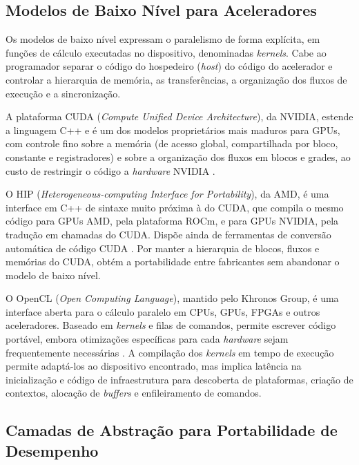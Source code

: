 
\subsection{Modelos de Baixo Nível para Aceleradores}\label{subsec:modelos-de-baixo-nivel}

Os modelos de baixo nível expressam o paralelismo de forma explícita, em funções de cálculo executadas no dispositivo, denominadas \textit{kernels}.
Cabe ao programador separar o código do hospedeiro (\textit{host}) do código do acelerador e controlar a hierarquia de memória, as transferências, a organização dos fluxos de execução e a sincronização.

A plataforma CUDA (\textit{Compute Unified Device Architecture}), da NVIDIA, estende a linguagem C++ e é um dos modelos proprietários mais maduros para GPUs, com controle fino sobre a memória (de acesso global, compartilhada por bloco, constante e registradores) e sobre a organização dos fluxos em blocos e grades, ao custo de restringir o código a \textit{hardware} NVIDIA \parencite{Chakrabarti2012}.

O HIP (\textit{Heterogeneous-computing Interface for Portability}), da AMD, é uma interface em C++ de sintaxe muito próxima à do CUDA, que compila o mesmo código para GPUs AMD, pela plataforma ROCm, e para GPUs NVIDIA, pela tradução em chamadas do CUDA.
Dispõe ainda de ferramentas de conversão automática de código CUDA \parencite{AMD2026HIP}.
Por manter a hierarquia de blocos, fluxos e memórias do CUDA, obtém a portabilidade entre fabricantes sem abandonar o modelo de baixo nível.

O OpenCL (\textit{Open Computing Language}), mantido pelo Khronos Group, é uma interface aberta para o cálculo paralelo em CPUs, GPUs, FPGAs e outros aceleradores.
Baseado em \textit{kernels} e filas de comandos, permite escrever código portável, embora otimizações específicas para cada \textit{hardware} sejam frequentemente necessárias \parencite{Stone2010}.
A compilação dos \textit{kernels} em tempo de execução permite adaptá-los ao dispositivo encontrado, mas implica latência na inicialização e código de infraestrutura para descoberta de plataformas, criação de contextos, alocação de \textit{buffers} e enfileiramento de comandos.


\subsection{Camadas de Abstração para Portabilidade de Desempenho}\label{subsec:camadas-de-abstracao}

